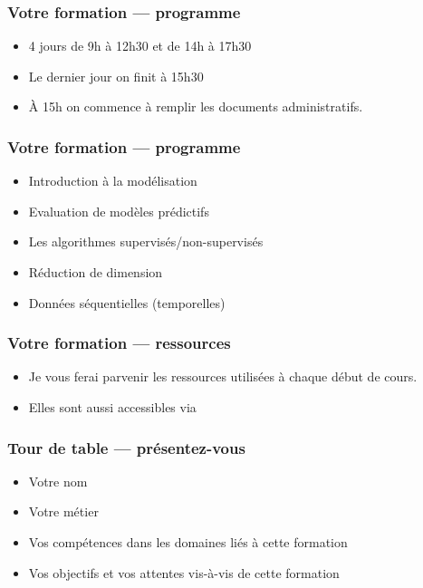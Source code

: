 \begin{frame}
  \frametitle{Votre formation — programme}
  \begin{itemize}
  \item 4 jours de 9h à 12h30 et de 14h à 17h30
  \item Le dernier jour on finit à 15h30
  \item À 15h on commence à remplir les documents administratifs.
  \end{itemize}
\end{frame}

\begin{frame}
  \frametitle{Votre formation — programme}
  \begin{itemize}
  \item Introduction à la modélisation
  \item Evaluation de modèles prédictifs
  \item Les algorithmes supervisés/non-supervisés
  \item Réduction de dimension
  \item Données séquentielles (temporelles)
  \end{itemize}
\end{frame}

\begin{frame}
  \frametitle{Votre formation — ressources}
  \begin{itemize}
  \item Je vous ferai parvenir les ressources utilisées à chaque début de cours.
  \item Elles sont aussi accessibles via 
  \end{itemize}
\end{frame}

\begin{frame}
  \frametitle{Tour de table — présentez-vous}
  \begin{itemize}
  \item Votre nom
  \item Votre métier
  \item Vos compétences dans les domaines liés à cette formation
  \item Vos objectifs et vos attentes vis-à-vis de cette formation
  \end{itemize}
\end{frame}

